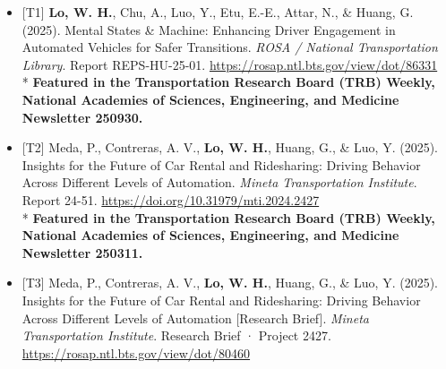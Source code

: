 \documentclass[11pt]{article}
\begin{document}
\begin{itemize}[leftmargin=*, topsep=0pt, itemsep=6pt]

  \item \begin{samepage}{[T1]} \textbf{Lo, W. H.}, Chu, A., Luo, Y., Etu, E.-E., Attar, N., \& Huang, G. (2025). Mental States \& Machine: Enhancing Driver Engagement in Automated Vehicles for Safer Transitions. \textit{ROSA / National Transportation Library}. Report REPS-HU-25-01. \href{https://rosap.ntl.bts.gov/view/dot/86331}{\url{https://rosap.ntl.bts.gov/view/dot/86331}}\\* \textbf{Featured in the Transportation Research Board (TRB) Weekly, National Academies of Sciences, Engineering, and Medicine Newsletter 250930.}
  \par\end{samepage}

  \item \begin{samepage}{[T2]} Meda, P., Contreras, A. V., \textbf{Lo, W. H.}, Huang, G., \& Luo, Y. (2025). Insights for the Future of Car Rental and Ridesharing: Driving Behavior Across Different Levels of Automation. \textit{Mineta Transportation Institute}. Report 24-51. \href{https://doi.org/10.31979/mti.2024.2427}{\url{https://doi.org/10.31979/mti.2024.2427}}\\* \textbf{Featured in the Transportation Research Board (TRB) Weekly, National Academies of Sciences, Engineering, and Medicine Newsletter 250311.}
  \par\end{samepage}

  \item \begin{samepage}{[T3]} Meda, P., Contreras, A. V., \textbf{Lo, W. H.}, Huang, G., \& Luo, Y. (2025). Insights for the Future of Car Rental and Ridesharing: Driving Behavior Across Different Levels of Automation [Research Brief]. \textit{Mineta Transportation Institute}. Research Brief · Project 2427. \href{https://rosap.ntl.bts.gov/view/dot/80460}{\url{https://rosap.ntl.bts.gov/view/dot/80460}}
  \par\end{samepage}

\end{itemize}

\vspace{0.6em}
\end{document}
